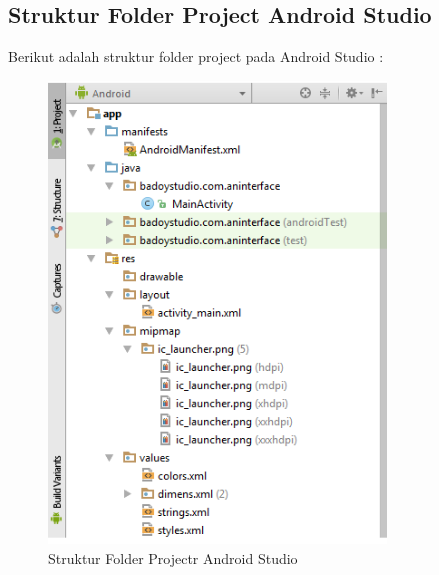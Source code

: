 \subsection{Struktur Folder Project Android Studio}
\par Berikut adalah struktur folder project pada Android Studio :
    \begin{figure}[H]
    \centering
    \includegraphics[width=0.8\textwidth]{figures/android22.png}
    \caption{Struktur Folder Projectr Android Studio}
    \label{print}
    \end{figure}
    
